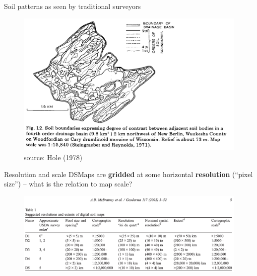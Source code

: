 \documentclass[aspectratio=169]{beamer}
\begin{document}
\begin{frame}{Soil patterns as seen by traditional surveyors}
    \begin{figure}
        \centering
        \includegraphics[height=0.75\textheight]{graphics_david/10.1016.0016-7061(78)90002-2_Fig12.png}
\\source: Hole (1978)
    \end{figure}
\end{frame}

\begin{frame}{Resolution and scale}
DSMaps are \textbf{gridded} at some horizontal \textbf{resolution} (``pixel size'') -- what is the relation to map scale?
\\[2ex]
    \begin{figure}
    \centering
\includegraphics[width=\textwidth]{./graphics_david/McBratney2013_Table1.png}
\end{figure}
\end{frame}
\end{document}
